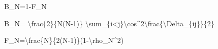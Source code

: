 \documentclass[
  a4paper,
]{ltjsarticle}
\newenvironment{Shaded}{}{}
\newcommand{\NormalTok}[1]{#1}
\begin{document}
\begin{Shaded}
\begin{Highlighting}[]
\NormalTok{B\_N=1{-}F\_N}
\end{Highlighting}
\end{Shaded}

\begin{Shaded}
\begin{Highlighting}[]
\NormalTok{B\_N=}
\NormalTok{\textbackslash{}frac\{2\}\{N(N{-}1)\}}
\NormalTok{\textbackslash{}sum\_\{i\textless{}j\}\textbackslash{}cos\^{}2\textbackslash{}frac\{\textbackslash{}Delta\_\{ij\}\}\{2\}}
\end{Highlighting}
\end{Shaded}

\begin{Shaded}
\begin{Highlighting}[]
\NormalTok{F\_N=\textbackslash{}frac\{N\}\{2(N{-}1)\}(1{-}\textbackslash{}rho\_N\^{}2)}
\end{Highlighting}
\end{Shaded}
\end{document}
